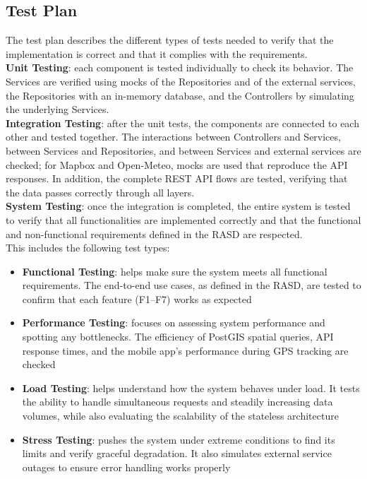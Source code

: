 \subsection{Test Plan}
The test plan describes the different types of tests needed to verify that the implementation is correct and that it complies with the requirements. \\
\textbf{Unit Testing}: each component is tested individually to check its behavior. The Services are verified using mocks of the Repositories and of the external services, the Repositories with an in-memory database, and the Controllers by simulating the underlying Services. \\
\textbf{Integration Testing}: after the unit tests, the components are connected to each other and tested together. The interactions between Controllers and Services, between Services and Repositories, and between Services and external services are checked; for Mapbox and Open-Meteo, mocks are used that reproduce the API responses. In addition, the complete REST API flows are tested, verifying that the data passes correctly through all layers. \\
\textbf{System Testing}: once the integration is completed, the entire system is tested to verify that all functionalities are implemented correctly and that the functional and non-functional requirements defined in the RASD are respected. \\
This includes the following test types:
\begin{itemize}
    \item \textbf{Functional Testing}: helps make sure the system meets all functional requirements. The end-to-end use cases, as defined in the RASD, are tested to confirm that each feature (F1–F7) works as expected
    \item \textbf{Performance Testing}: focuses on assessing system performance and spotting any bottlenecks. The efficiency of PostGIS spatial queries, API response times, and the mobile app’s performance during GPS tracking are checked
    \item \textbf{Load Testing}: helps understand how the system behaves under load. It tests the ability to handle simultaneous requests and steadily increasing data volumes, while also evaluating the scalability of the stateless architecture
    \item \textbf{Stress Testing}: pushes the system under extreme conditions to find its limits and verify graceful degradation. It also simulates external service outages to ensure error handling works properly
\end{itemize}

